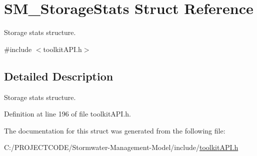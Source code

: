 \hypertarget{struct_s_m___storage_stats}{}\section{S\+M\+\_\+\+Storage\+Stats Struct Reference}
\label{struct_s_m___storage_stats}


Storage stats structure.  




{\ttfamily \#include $<$toolkit\+A\+P\+I.\+h$>$}



\subsection{Detailed Description}
Storage stats structure. 

Definition at line 196 of file toolkit\+A\+P\+I.\+h.



The documentation for this struct was generated from the following file\+:\begin{DoxyCompactItemize}
\item 
C\+:/\+P\+R\+O\+J\+E\+C\+T\+C\+O\+D\+E/\+Stormwater-\/\+Management-\/\+Model/include/\hyperlink{toolkit_a_p_i_8h}{toolkit\+A\+P\+I.\+h}\end{DoxyCompactItemize}
